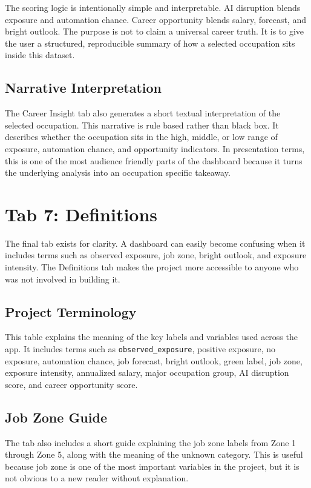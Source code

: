\documentclass[11pt]{article}
\begin{document}
The scoring logic is intentionally simple and interpretable. AI disruption blends exposure and automation chance. Career opportunity blends salary, forecast, and bright outlook. The purpose is not to claim a universal career truth. It is to give the user a structured, reproducible summary of how a selected occupation sits inside this dataset.

\subsection*{Narrative Interpretation}

The Career Insight tab also generates a short textual interpretation of the selected occupation. This narrative is rule based rather than black box. It describes whether the occupation sits in the high, middle, or low range of exposure, automation chance, and opportunity indicators. In presentation terms, this is one of the most audience friendly parts of the dashboard because it turns the underlying analysis into an occupation specific takeaway.

\section*{Tab 7: Definitions}

The final tab exists for clarity. A dashboard can easily become confusing when it includes terms such as observed exposure, job zone, bright outlook, and exposure intensity. The Definitions tab makes the project more accessible to anyone who was not involved in building it.

\subsection*{Project Terminology}

This table explains the meaning of the key labels and variables used across the app. It includes terms such as \texttt{observed\_exposure}, positive exposure, no exposure, automation chance, job forecast, bright outlook, green label, job zone, exposure intensity, annualized salary, major occupation group, AI disruption score, and career opportunity score.

\subsection*{Job Zone Guide}

The tab also includes a short guide explaining the job zone labels from Zone 1 through Zone 5, along with the meaning of the unknown category. This is useful because job zone is one of the most important variables in the project, but it is not obvious to a new reader without explanation.
\end{document}
